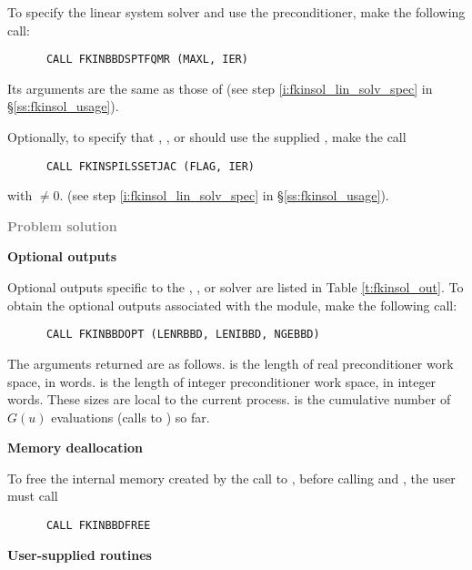 \begin{Steps}
  To specify the {\sptfqmr} linear system solver and use the {\kinbbdpre}
  preconditioner, make the following call:
\begin{verbatim}
      CALL FKINBBDSPTFQMR (MAXL, IER)
\end{verbatim}
  Its arguments are the same as those of 
  (see step \ref{i:fkinsol_lin_solv_spec} in \S\ref{ss:fkinsol_usage}).

  Optionally, to specify that {\spgmr}, {\spbcg}, or {\sptfqmr} should use
  the supplied , make the call
\begin{verbatim}
      CALL FKINSPILSSETJAC (FLAG, IER)
\end{verbatim}
  with  $\neq 0$.
  (see step \ref{i:fkinsol_lin_solv_spec} in \S\ref{ss:fkinsol_usage}).


\item \textcolor{gray}{\bf Problem solution}

\item {\bf {\kinbbdpre} Optional outputs}

  Optional outputs specific to the {\spgmr}, {\spbcg}, or {\sptfqmr} solver are
  listed in Table \ref{t:fkinsol_out}.
  To obtain the optional outputs associated with the {\kinbbdpre} module, make
  the following call:
\begin{verbatim}
      CALL FKINBBDOPT (LENRBBD, LENIBBD, NGEBBD)
\end{verbatim}
  The arguments returned are as follows.
   is the length of real preconditioner work space, in 
  words.  is the length of integer preconditioner work space, in
  integer words. These sizes are local to the current process.
   is the cumulative number of $G(u)$ evaluations (calls to )
  so far.
  
\item {\bf Memory deallocation}

  To free the internal memory created by the call to , before
  calling  and , the user must call
\begin{verbatim}
      CALL FKINBBDFREE
\end{verbatim}

\item {\bf User-supplied routines}


\end{Steps}
